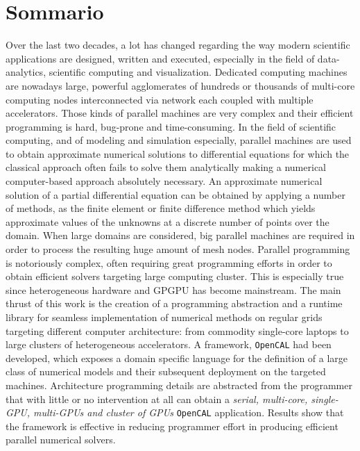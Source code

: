 \endgroup

\cleardoublepage%

\begingroup
\let\clearpage\relax
\let\cleardoublepage\relax
\let\cleardoublepage\relax

\chapter*{Sommario}


Over the last two decades, a lot has changed regarding the way modern scientific applications are designed, written and executed, especially in the field of data-analytics, scientific computing and visualization. Dedicated computing machines are nowadays large, powerful agglomerates of hundreds or thousands of multi-core computing nodes interconnected via  network each coupled with multiple accelerators. Those kinds of parallel machines are very complex and their efficient programming is hard, bug-prone and time-consuming. 
In the field of scientific computing, and of modeling and simulation especially, parallel machines are used to obtain approximate numerical solutions to differential equations
for which the classical approach often fails to solve them analytically making a numerical computer-based approach absolutely necessary.
An approximate numerical solution of a partial differential equation can be obtained by applying a number of methods, as the finite element or finite difference method which yields approximate values of the unknowns at a discrete number of points over the domain.
When large domains are considered, big parallel machines are required in order to process the resulting huge amount of mesh nodes. Parallel programming is notoriously complex, often requiring great programming efforts in order to obtain efficient solvers targeting large computing cluster. This is especially true since heterogeneous hardware and GPGPU has become mainstream.
The main thrust of this work is the creation of a programming abstraction and a runtime library for seamless implementation of numerical methods on regular grids targeting different computer architecture: from commodity single-core laptops to large clusters of heterogeneous accelerators. A framework, \texttt{OpenCAL} had been developed, which exposes a domain specific language for the definition of a large class of numerical models and their subsequent deployment on the targeted machines. Architecture programming details are abstracted from the programmer that with little or no intervention at all can obtain a \textit{serial, multi-core, single-GPU, multi-GPUs and cluster of GPUs} \texttt{OpenCAL} application. 
Results show that the framework is effective in reducing programmer effort in producing efficient parallel numerical solvers.



\endgroup

\vfill